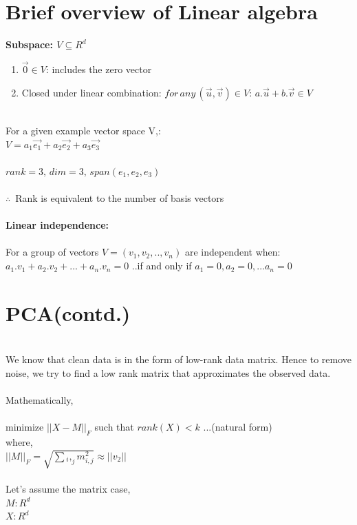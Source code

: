 \documentclass[12pt]{article}
\begin{document}
\section{Brief overview of Linear algebra}

\textbf{Subspace: $V \subseteq  R^d $}
\begin{enumerate}
    \item{$\vec{0} \in V$: includes the zero vector}
    \item{Closed under linear combination}: $for\,any\,(\vec{u},\vec{v}) \in V$: $  a.\vec{u} + b.\vec{v} \in V$
\end{enumerate}
\\
For a given example vector space V,:\\

$V={a_1\vec{e_1}+a_2\vec{e_2}+a_3\vec{e_3}}$\\
\\$rank = 3,\,dim = 3,\,span(e_1,e_2,e_3)$\\
\\$\therefore\,$ Rank is equivalent to the number of basis vectors\\
\\
\textbf{Linear independence:}\\
\\
For a group of vectors $V= (v_1,v_2,..,v_n)$ are independent when:\\

$a_1.v_1+a_2.v_2+...+a_n.v_n=0$     ..if and only if $a_1=0,a_2=0,...a_n=0$

\section{PCA(contd.)}
\\
We know that clean data is in the form of low-rank data matrix. Hence to remove noise, we try to find a low rank matrix that approximates the observed data.\\
\\
Mathematically,\\

\\minimize $||X - M||_F$ such that $rank(X)<k$       ...(natural form)\\
where,\\$||M||_F=\sqrt{\sum{_i,_j}m^2_{i,j}} \approx ||v_2||$\\
\\
Let's assume the matrix case,\\
$M: R^d$\\$X: R^d$\\
\end{document}
